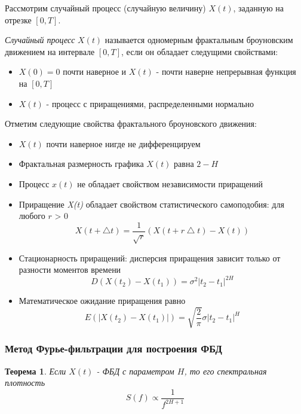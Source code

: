 Рассмотрим случайный процесс (случайную величину) $X(t)$, заданную на отрезке $[0, T]$.

\textit{Случайный процесс}  $X(t)$ называется одномерным фрактальным броуновским движением на интервале $[0, T]$, если он обладает следущими свойствами:

\begin{itemize}
	\item $X(0) = 0$ почти наверное и $X(t)$ - почти наверне непрерывная функция на $[0, T]$
	\item  $X(t)$ - процесс с приращениями, распределенными нормально
\end{itemize}

Отметим следующие свойства фрактального броуновского движения:

\begin{itemize}
	\item $X(t)$ почти наверное нигде не дифференцируем 
	\item Фрактальная размерность графика $X(t)$ равна $2 - H$
	\item Процесс $x(t)$ не обладает свойством независимости приращений
	\item Приращение \textit{X(t)} обладает свойством статистического самоподобия: для любого $r$ > 0
	\begin{equation}
		X(t+ \bigtriangleup t) = \frac{1}{\sqrt{r}}(X(t+r\bigtriangleup t) - X(t))
	\end{equation}
	\item Стационарность приращений: дисперсия приращения зависит только от разности моментов времени
	\begin{equation} \label{1.6}
		D(X(t_2) - X(t_1)) = \sigma^2|t_2-t_1|^{2H}
	\end{equation}
	\item Математическое ожидание приращения равно
	\begin{equation}
		E(|X(t_2) - X(t_1)|) = \sqrt{\frac{2}{\pi}}\sigma|t_2-t_1|^H
	\end{equation}
\end{itemize}

\subsubsection{Метод Фурье-фильтрации для построения ФБД}

\newtheorem{theorem1}{Теорема}
\begin{theorem1}
	Если $X(t)$ - ФБД с параметром $H$, то его спектральная плотность 
	\begin{equation}
		S(f) \propto \frac{1}{f^{2H+1}}
	\end{equation}
\end{theorem1}

